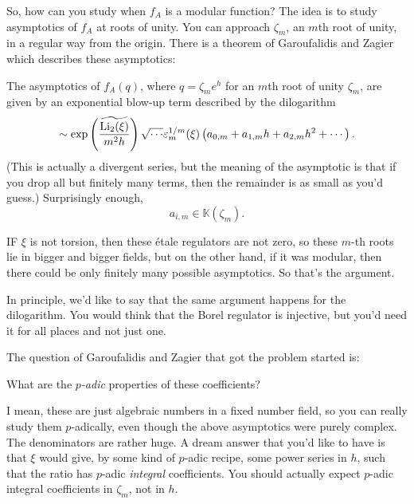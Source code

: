 \documentclass[reqno]{amsart} 
\begin{document}
So, how can you study when $f_A$ is a modular function?  The idea is to study asymptotics of $f_A$ at roots of unity.  You can approach $\zeta_m$, an $m$th root of unity, in a regular way from the origin.  There is a theorem of Garoufalidis and Zagier which describes these asymptotics:
\begin{theorem}
  The asymptotics of $f_A(q)$, where $q = \zeta_m e^h$ for an $m$th root of unity $\zeta_m$, are given by an exponential blow-up term described by the dilogarithm
  \begin{equation*}
    \sim \exp \left(
      \frac{\widetilde{\operatorname{Li}_2(\xi)}}{m^2 h}
    \right)
    \sqrt{\dotsb}
    \varepsilon_m^{1/m}(\xi)
    \left( a_{0, m} + a_{1, m} h + a_{2, m} h^2 + \dotsb \right).
  \end{equation*}
  (This is actually a divergent series, but the meaning of the asymptotic is that if you drop all but finitely many terms, then the remainder is as small as you'd guess.)  Surprisingly enough,
  \begin{equation*}
    a_{i, m} \in \mathbb{K}(\zeta_m).
  \end{equation*}
\end{theorem}
IF $\xi$ is not torsion, then these {\'e}tale regulators are not zero, so these $m$-th roots lie in bigger and bigger fields, but on the other hand, if it was modular, then there could be only finitely many possible asymptotics.  So that's the argument.

In principle, we'd like to say that the same argument happens for the dilogarithm.  You would think that the Borel regulator is injective, but you'd need it for all places and not just one.

The question of Garoufalidis and Zagier that got the problem started is:
\begin{question}
  What are the $p$\emph{-adic} properties of these coefficients?
\end{question}
I mean, these are just algebraic numbers in a fixed number field, so you can really study them $p$-adically, even though the above asymptotics were purely complex.  The denominators are rather huge.  A dream answer that you'd like to have is that $\xi$ would give, by some kind of $p$-adic recipe, some power series in $h$, such that the ratio has $p$-adic \emph{integral} coefficients.  You should actually expect $p$-adic integral coefficients in $\zeta_m$, not in $h$.
\end{document}
